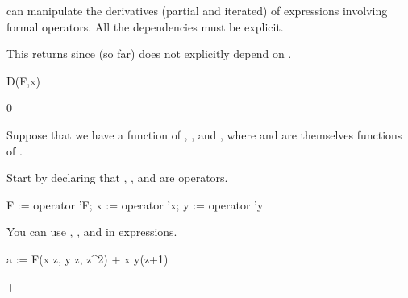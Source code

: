 {{{{{{{{\Language{} can manipulate the derivatives (partial and iterated) of
expressions involving formal operators.
All the dependencies must be explicit.
\begin{xtc}
\begin{xtccomment}
This returns  since  (so far)
does not explicitly depend on .
\end{xtccomment}
\begin{spadsrc}
D(F,x)
\end{spadsrc}
\begin{TeXOutput}
\begin{fricasmath}{7}
0%
\end{fricasmath}
\end{TeXOutput}
\end{xtc}
Suppose that we have  a function of ,
, and , where  and  are themselves
functions of .
\begin{xtc}
\begin{xtccomment}
Start by declaring that , , and 
are operators.
\end{xtccomment}
\begin{spadsrc}
F := operator 'F; x := operator 'x; y := operator 'y
\end{spadsrc}
\begin{TeXOutput}
\begin{fricasmath}{8}
%
\end{fricasmath}
\end{TeXOutput}
\end{xtc}
\begin{xtc}
\begin{xtccomment}
You can use , , and  in expressions.
\end{xtccomment}
\begin{spadsrc}
a := F(x z, y z, z^2) + x y(z+1) 
\end{spadsrc}
\begin{TeXOutput}
\begin{fricasmath}{9}
+%
\end{fricasmath}
\end{TeXOutput}
\end{xtc}
\begin{xtc}

\end{xtc}}}}}}}}}
